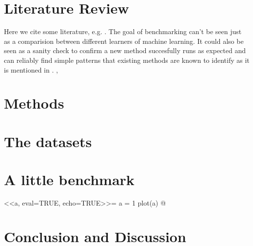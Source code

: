 \documentclass[a4paper]{article}
\begin{document}
\section{Literature Review}

\label{sec:literature}
  
Here we cite some literature, e.g. \citet{Bischl2017}.
The goal of benchmarking can't be seen just as a comparision between different learners of machine learning.
It could also be seen as a sanity check to confirm a new method succesfully runs as expected and can reliably find simple patterns that existing methods are known to identify as it is mentioned in \citet{Hastie2009}. 
\newline
  \citet{Olson2017},
  \citet{OpenML2013}

  


\section{Methods}

\section{The datasets}
 
\section{A little benchmark}

<<a, eval=TRUE, echo=TRUE>>=
  a = 1
  plot(a)
@

\section{Conclusion and Discussion}
\label{sec:conclusion}

\FloatBarrier


\end{document}
